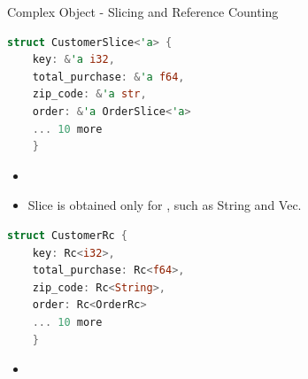 \documentclass[9pt]{beamer}
\begin{document}
\begin{frame}[t,fragile]{Complex Object - Slicing and Reference Counting }

\begin{minipage}{0.5\linewidth}
\centering
\begin{lstlisting}[language=Rust]
struct CustomerSlice<'a> {
    key: &'a i32,
    total_purchase: &'a f64,
    zip_code: &'a str,
    order: &'a OrderSlice<'a>
    ... 10 more 
    }
\end{lstlisting}
\end{minipage}\hfill  
\begin{minipage}{0.5\linewidth}
\centering
\begin{itemize}
    \item {} 
    \item Slice is obtained only for , such as String and Vec.
\end{itemize}
\end{minipage}

\begin{minipage}{0.5\linewidth}
\centering
\begin{lstlisting}[language=Rust]
struct CustomerRc {
    key: Rc<i32>,
    total_purchase: Rc<f64>,
    zip_code: Rc<String>,
    order: Rc<OrderRc>
    ... 10 more 
    }
\end{lstlisting}
\end{minipage}\hfill  
\begin{minipage}{0.5\linewidth}
\centering
\begin{itemize}
    \item {}
\end{itemize}
\end{minipage}
    
\end{frame}

\end{document}

